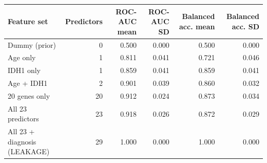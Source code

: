 \begin{tabular}{lrrrrr}
\toprule
\textbf{Feature set} & \textbf{Predictors} & \textbf{ROC-AUC mean} & \textbf{ROC-AUC SD} & \textbf{Balanced acc. mean} & \textbf{Balanced acc. SD} \\
\midrule
Dummy (prior) & 0 & 0.500 & 0.000 & 0.500 & 0.000 \\
Age only & 1 & 0.811 & 0.041 & 0.721 & 0.046 \\
IDH1 only & 1 & 0.859 & 0.041 & 0.859 & 0.041 \\
Age + IDH1 & 2 & 0.901 & 0.039 & 0.860 & 0.032 \\
20 genes only & 20 & 0.912 & 0.024 & 0.873 & 0.034 \\
All 23 predictors & 23 & 0.918 & 0.026 & 0.872 & 0.029 \\
All 23 + diagnosis (LEAKAGE) & 29 & 1.000 & 0.000 & 1.000 & 0.000 \\
\bottomrule
\end{tabular}
